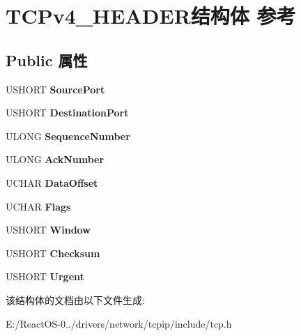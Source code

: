 \hypertarget{struct_t_c_pv4___h_e_a_d_e_r}{}\section{T\+C\+Pv4\+\_\+\+H\+E\+A\+D\+E\+R结构体 参考}
\label{struct_t_c_pv4___h_e_a_d_e_r}
\subsection*{Public 属性}
\begin{DoxyCompactItemize}
\item 
\mbox{\label{struct_t_c_pv4___h_e_a_d_e_r_a59fdfe7a5e0051e0df83ff372a34110f}} 
U\+S\+H\+O\+RT {\bfseries Source\+Port}
\item 
\mbox{\label{struct_t_c_pv4___h_e_a_d_e_r_a76e9a1ef32a665dcda4141c03c55a677}} 
U\+S\+H\+O\+RT {\bfseries Destination\+Port}
\item 
\mbox{\label{struct_t_c_pv4___h_e_a_d_e_r_aa9786504a3298177d8e6e80e4215a110}} 
U\+L\+O\+NG {\bfseries Sequence\+Number}
\item 
\mbox{\label{struct_t_c_pv4___h_e_a_d_e_r_a817ee44ed8fe6b95122523f75273784e}} 
U\+L\+O\+NG {\bfseries Ack\+Number}
\item 
\mbox{\label{struct_t_c_pv4___h_e_a_d_e_r_ae5594811a37b053b96ba5328a0be2b33}} 
U\+C\+H\+AR {\bfseries Data\+Offset}
\item 
\mbox{\label{struct_t_c_pv4___h_e_a_d_e_r_a3bbd474c86101dc3157a2e051d358337}} 
U\+C\+H\+AR {\bfseries Flags}
\item 
\mbox{\label{struct_t_c_pv4___h_e_a_d_e_r_a3e443fc2217df819165d66f254f2ca9e}} 
U\+S\+H\+O\+RT {\bfseries Window}
\item 
\mbox{\label{struct_t_c_pv4___h_e_a_d_e_r_a4efe566a407c20a402f5b7417a3dc83c}} 
U\+S\+H\+O\+RT {\bfseries Checksum}
\item 
\mbox{\label{struct_t_c_pv4___h_e_a_d_e_r_a580c450e0f0ab33bc332a49e669d1139}} 
U\+S\+H\+O\+RT {\bfseries Urgent}
\end{DoxyCompactItemize}


该结构体的文档由以下文件生成\+:\begin{DoxyCompactItemize}
\item 
E\+:/\+React\+O\+S-\/0../drivers/network/tcpip/include/tcp.\+h\end{DoxyCompactItemize}
